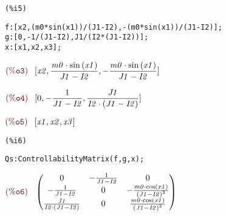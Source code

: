 \noindent
\begin{minipage}[t]{8ex}\color{red}\bf
\begin{verbatim}
(%i5) 
\end{verbatim}
\end{minipage}
\begin{minipage}[t]{\textwidth}\color{blue}
\begin{verbatim}
f:[x2,(m0*sin(x1))/(J1-I2),-(m0*sin(x1))/(J1-I2)];
g:[0,-1/(J1-I2),J1/(I2*(J1-I2))];
x:[x1,x2,x3];
\end{verbatim}
\end{minipage}

\noindent
\begin{math}\displaystyle
\parbox{8ex}{$\color{labelcolor}\mathrm{\tt (\%o3) }\quad $}
[\mathit{x2},\frac{\mathit{m0}\cdot \mathrm{sin}\left( \mathit{x1}\right) }{\mathit{J1}-\mathit{I2}},-\frac{\mathit{m0}\cdot \mathrm{sin}\left( \mathit{x1}\right) }{\mathit{J1}-\mathit{I2}}]
\end{math}

\noindent
\begin{math}\displaystyle
\parbox{8ex}{$\color{labelcolor}\mathrm{\tt (\%o4) }\quad $}
[0,-\frac{1}{\mathit{J1}-\mathit{I2}},\frac{\mathit{J1}}{\mathit{I2}\cdot \left( \mathit{J1}-\mathit{I2}\right) }]
\end{math}

\noindent
\begin{math}\displaystyle
\parbox{8ex}{$\color{labelcolor}\mathrm{\tt (\%o5) }\quad $}
[\mathit{x1},\mathit{x2},\mathit{x3}]\mbox{}
\end{math}


\noindent
\begin{minipage}[t]{8ex}\color{red}\bf
\begin{verbatim}
(%i6) 
\end{verbatim}
\end{minipage}
\begin{minipage}[t]{\textwidth}\color{blue}
\begin{verbatim}
Qs:ControllabilityMatrix(f,g,x);
\end{verbatim}
\end{minipage}

\noindent
\begin{math}\displaystyle
\parbox{8ex}{$\color{labelcolor}\mathrm{\tt (\%o6) }\quad $}
\begin{pmatrix}0 & -\frac{1}{\mathit{J1}-\mathit{I2}} & 0\cr -\frac{1}{\mathit{J1}-\mathit{I2}} & 0 & -\frac{\mathit{m0}\cdot \mathrm{cos}\left( \mathit{x1}\right) }{{{\left( \mathit{J1}-\mathit{I2}\right) }^{2}}}\cr \frac{\mathit{J1}}{\mathit{I2}\cdot \left( \mathit{J1}-\mathit{I2}\right) } & 0 & \frac{\mathit{m0}\cdot \mathrm{cos}\left( \mathit{x1}\right) }{{{\left( \mathit{J1}-\mathit{I2}\right) }^{2}}}\end{pmatrix}\mbox{}
\end{math}


